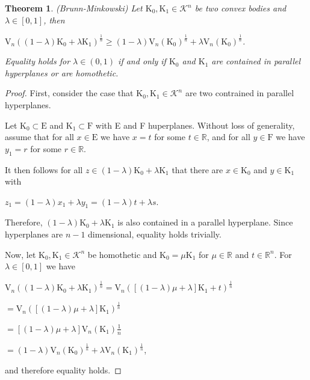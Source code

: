 \documentclass[a4paper]{book}
\newtheorem{theorem}{Theorem}%
\numberwithin{theorem}{section}%
\begin{document}
\begin{theorem}(Brunn-Minkowski)
    Let $\mathrm{K}_{0},\mathrm{K}_{1}\in\mathscr{K}^{n}$ be two convex bodies and $\lambda\in[0,1]$, then
    \begin{center}
        $\displaystyle \mathrm{V}_{n}((1-\lambda)\mathrm{K}_{0}+\lambda\mathrm{K}_{1})^{\frac{1}{n}}\geq (1-\lambda)\mathrm{V}_{n}(\mathrm{K}_{0})^{\frac{1}{n}}+\lambda\mathrm{V}_{n}(\mathrm{K}_{0})^{\frac{1}{n}}$.
    \end{center}
    Equality holds for $\lambda\in(0, 1)$ if and only if $\mathrm{K}_{0}$ and $\mathrm{K}_{1}$ are contained in parallel hyperplanes or are homothetic.
\end{theorem}
\begin{proof}
    First, consider the case that $\mathrm{K}_{0},\mathrm{K}_{1}\in\mathscr{K}^{n}$ are two contrained in parallel hyperplanes.
    
    Let $\mathrm{K}_{0}\subset\mathrm{E}$ and $\mathrm{K}_{1}\subset\mathrm{F}$ with E and F huperplanes. Without loss of generality, assume that for all $x\in\mathrm{E}$ we have $x=t$ for some $t\in\mathbb{R}$, and for all $y\in\mathrm{F}$ we have $y_{1}=r$ for some $r\in\mathbb{R}$.
    
    It then follows for all $z\in(1-\lambda)\mathrm{K}_{0}+\lambda\mathrm{K}_{1}$ that there are $x\in\mathrm{K}_{0}$ and $y\in\mathrm{K}_{1}$ with
    \begin{center}
        $z_{1}=(1-\lambda)x_{1}+\lambda y_{1}=(1-\lambda)t+\lambda s$.
    \end{center}
    Therefore, $(1-\lambda)\mathrm{K}_{0}+\lambda\mathrm{K}_{1}$ is also contained in a parallel hyperplane. Since hyperplanes are $n-1$ dimensional, equality holds trivially.

    Now, let $\mathrm{K}_{0},\mathrm{K}_{1}\in\mathscr{K}^{n}$ be homothetic and $\mathrm{K}_{0}=\mu\mathrm{K}_{1}$ for $\mu\in\mathbb{R}$ and $t\in\mathbb{R}^{n}$. For $\lambda\in[0,1]$ we have
    \begin{center}
        $\mathrm{V}_{n}((1-\lambda)\mathrm{K}_{0}+\lambda\mathrm{K}_{1})^{\frac{1}{n}}=\mathrm{V}_{n}([(1-\lambda)\mu+\lambda]\mathrm{K}_{1}+t)^{\frac{1}{n}}$

        $=\mathrm{V}_{n}([(1-\lambda)\mu+\lambda]\mathrm{K}_{1})^{\frac{1}{n}}$

        $=[(1-\lambda)\mu+\lambda]\mathrm{V}_{n}(\mathrm{K}_{1}){\frac{1}{n}}$

        $=(1-\lambda)\mathrm{V}_{n}(\mathrm{K}_{0})^{\frac{1}{n}}+\lambda\mathrm{V}_{n}(\mathrm{K}_{1})^{\frac{1}{n}}$,
    \end{center}
    and therefore equality holds.


\end{proof}
\end{document}
